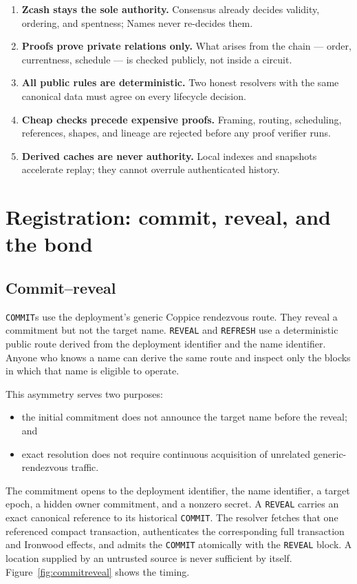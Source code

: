 \documentclass[11pt]{article}
\newcommand{\operation}[1]{\texttt{#1}}
\begin{document}
\begin{enumerate}
\item \textbf{Zcash stays the sole authority.} Consensus already decides
validity, ordering, and spentness; Names never re-decides them.
\item \textbf{Proofs prove private relations only.} What arises from the
chain --- order, currentness, schedule --- is checked publicly, not inside a
circuit.
\item \textbf{All public rules are deterministic.} Two honest resolvers with
the same canonical data must agree on every lifecycle decision.
\item \textbf{Cheap checks precede expensive proofs.} Framing, routing,
scheduling, references, shapes, and lineage are rejected before any proof
verifier runs.
\item \textbf{Derived caches are never authority.} Local indexes and
snapshots accelerate replay; they cannot overrule authenticated history.
\end{enumerate}

\section{Registration: commit, reveal, and the bond}
\label{sec:registration}

\subsection{Commit--reveal}

\operation{COMMIT}s use the deployment's generic Coppice rendezvous route.
They reveal a commitment but not the target name. \operation{REVEAL} and
\operation{REFRESH} use a deterministic public route derived from the
deployment identifier and the name identifier. Anyone who knows a name can
derive the same route and inspect only the blocks in which that name is
eligible to operate.

This asymmetry serves two purposes:

\begin{itemize}
\item the initial commitment does not announce the target name before the
reveal; and
\item exact resolution does not require continuous acquisition of unrelated
generic-rendezvous traffic.
\end{itemize}

The commitment opens to the deployment identifier, the name identifier, a
target epoch, a hidden owner commitment, and a nonzero secret. A
\operation{REVEAL} carries an exact canonical reference to its historical
\operation{COMMIT}. The resolver fetches that one referenced compact
transaction, authenticates the corresponding full transaction and Ironwood
effects, and admits the \operation{COMMIT} atomically with the
\operation{REVEAL} block. A location supplied by an untrusted source is never
sufficient by itself. Figure~\ref{fig:commitreveal} shows the timing.
\end{document}
